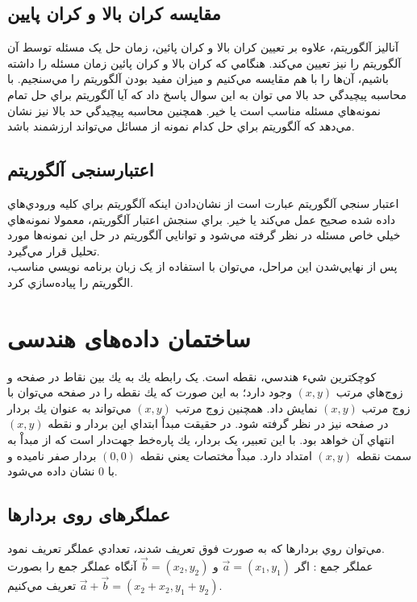 \documentclass{book}
\begin{document}
\section*{مقایسه کران بالا و کران پایین}
آناليز آلگوريتم، علاوه بر تعيين کران بالا و کران پائين، زمان حل يک مسئله توسط آن آلگوريتم را نيز تعيين مي‌کند. هنگامي که کران بالا و کران پائين زمان مسئله را داشته باشيم، آن‌ها را با هم مقايسه مي‌کنيم و ميزان مفيد بودن آلگوريتم را مي‌سنجيم. با محاسبه پيچيدگي حد بالا مي توان به اين سوال پاسخ داد که آيا آلگوريتم براي حل تمام نمونه‌هاي مسئله مناسب است يا خير. همچنين محاسبه پيچيدگي حد بالا نيز نشان مي‌دهد که آلگوريتم براي حل کدام نمونه از مسائل مي‌تواند ارزشمند باشد. 
\section*{اعتبارسنجی آلگوریتم}	
اعتبار سنجي آلگوريتم عبارت است از نشان‌دادن اينکه آلگوريتم براي کليه ورودي‌هاي داده شده صحيح عمل مي‌کند يا خير. براي سنجش اعتبار آلگوريتم، معمولا نمونه‌هاي خيلي خاص مسئله در نظر گرفته مي‌شود و توانايي آلگوريتم در حل اين نمونه‌ها مورد تحليل قرار مي‌گيرد.\\
پس از نهايي‌شدن اين مراحل، مي‌توان با استفاده از يک زبان برنامه نويسي مناسب، الگوريتم را پياده‌سازي کرد.
\chapter{ساختمان داده‌های هندسی}
كوچكترين شيء هندسي، نقطه است. يک رابطه يك به يك بين نقاط در صفحه و زوج‌هاي مرتب $(x,y)$ وجود دارد؛ به اين صورت که يك نقطه را در صفحه مي‌توان با زوج مرتب $(x,y)$ نمايش داد. همچنين زوج مرتب $(x,y)$ مي‌تواند به عنوان يك بردار در صفحه نيز در نظر گرفته شود. در حقيقت مبداْ ابتداي اين بردار و نقطه $(x,y)$  انتهاي آن خواهد بود. با اين تعبير، يک بردار، يك پاره‌خط جهت‌دار است که از مبداْ به سمت نقطه $(x,y)$ امتداد دارد. مبداْ مختصات يعني نقطه $(0,0)$‌ بردار صفر ناميده و با $0$ نشان داده مي‌شود.
\section*{عملگرهای روی بردارها}	
مي‌توان روي بردارها که به صورت فوق تعريف شدند، تعدادي عملگر تعريف نمود.\\

عملگر جمع : اگر
$\vec{a} = (x_{1},y_{1})$
و
$\vec{b} = (x_{2},y_{2})$
آنگاه  عملگر جمع ‏را بصورت 
$\vec{a}+\vec{b} = (x_{2}+x_{2},y_{1}+y_{2})$
 تعريف مي‌کنيم.\\
 
\end{document}
